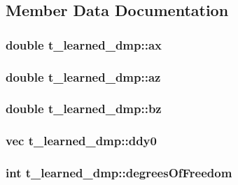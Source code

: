 \subsection{\-Member \-Data \-Documentation}
\hypertarget{structt__learned__dmp_ac0656ef16f7e7e2dd32d5798f2accb8e}{
\subsubsection[{ax}]{\setlength{\rightskip}{0pt plus 5cm}double {\bf t\-\_\-learned\-\_\-dmp\-::ax}}}\label{structt__learned__dmp_ac0656ef16f7e7e2dd32d5798f2accb8e}
\hypertarget{structt__learned__dmp_ad2f53d36140780f2ac8ef1942282b5b8}{
\subsubsection[{az}]{\setlength{\rightskip}{0pt plus 5cm}double {\bf t\-\_\-learned\-\_\-dmp\-::az}}}\label{structt__learned__dmp_ad2f53d36140780f2ac8ef1942282b5b8}
\hypertarget{structt__learned__dmp_a399840eaaf10b110bc2303d9ac82d60d}{
\subsubsection[{bz}]{\setlength{\rightskip}{0pt plus 5cm}double {\bf t\-\_\-learned\-\_\-dmp\-::bz}}}\label{structt__learned__dmp_a399840eaaf10b110bc2303d9ac82d60d}
\hypertarget{structt__learned__dmp_ad8c415789299b3ded30c0e1df84c899e}{
\subsubsection[{ddy0}]{\setlength{\rightskip}{0pt plus 5cm}vec {\bf t\-\_\-learned\-\_\-dmp\-::ddy0}}}\label{structt__learned__dmp_ad8c415789299b3ded30c0e1df84c899e}
\hypertarget{structt__learned__dmp_aa95fa8f54e4304a18b701183e229a122}{
\subsubsection[{degrees\-Of\-Freedom}]{\setlength{\rightskip}{0pt plus 5cm}int {\bf t\-\_\-learned\-\_\-dmp\-::degrees\-Of\-Freedom}}}\label{structt__learned__dmp_aa95fa8f54e4304a18b701183e229a122}
